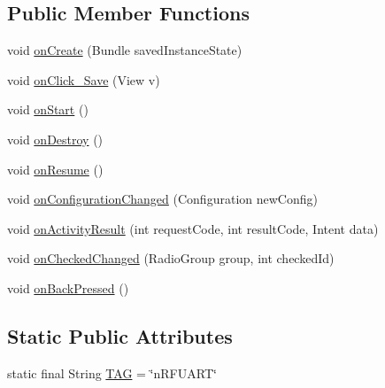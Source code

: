 \subsection*{Public Member Functions}
\begin{DoxyCompactItemize}
\item 
void \hyperlink{classcom_1_1mdex_1_1venus_alpha01a_1_1_main_activity_adeefcd12920885b63f807a0494acc656}{on\+Create} (Bundle saved\+Instance\+State)
\item 
void \hyperlink{classcom_1_1mdex_1_1venus_alpha01a_1_1_main_activity_aae1192c85319cc1b9091d1aac5dedea7}{on\+Click\+\_\+\+Save} (View v)
\item 
void \hyperlink{classcom_1_1mdex_1_1venus_alpha01a_1_1_main_activity_ab83f1d2698e17416e378f2fd124cd009}{on\+Start} ()
\item 
void \hyperlink{classcom_1_1mdex_1_1venus_alpha01a_1_1_main_activity_a20e66ba31d13b1cf0b159c2c0f3bb11a}{on\+Destroy} ()
\item 
void \hyperlink{classcom_1_1mdex_1_1venus_alpha01a_1_1_main_activity_a364c4caf4bfd52fffa1a1a45bc5c50ef}{on\+Resume} ()
\item 
void \hyperlink{classcom_1_1mdex_1_1venus_alpha01a_1_1_main_activity_a1a4a152521d974a94bd1c5b4f5d8b7c2}{on\+Configuration\+Changed} (Configuration new\+Config)
\item 
void \hyperlink{classcom_1_1mdex_1_1venus_alpha01a_1_1_main_activity_a0d189b5900400ad8feff362006740eb2}{on\+Activity\+Result} (int request\+Code, int result\+Code, Intent data)
\item 
void \hyperlink{classcom_1_1mdex_1_1venus_alpha01a_1_1_main_activity_a9741ce4002ae211b25156c13dbfcbd10}{on\+Checked\+Changed} (Radio\+Group group, int checked\+Id)
\item 
void \hyperlink{classcom_1_1mdex_1_1venus_alpha01a_1_1_main_activity_afb10fcbdb9fec993caad1df3bacb5ad1}{on\+Back\+Pressed} ()
\end{DoxyCompactItemize}
\subsection*{Static Public Attributes}
\begin{DoxyCompactItemize}
\item 
static final String \hyperlink{classcom_1_1mdex_1_1venus_alpha01a_1_1_main_activity_aa901395d4749a648acaf3a7c39f13210}{T\+AG} = \char`\"{}n\+R\+F\+U\+A\+RT\char`\"{}
\end{DoxyCompactItemize}
